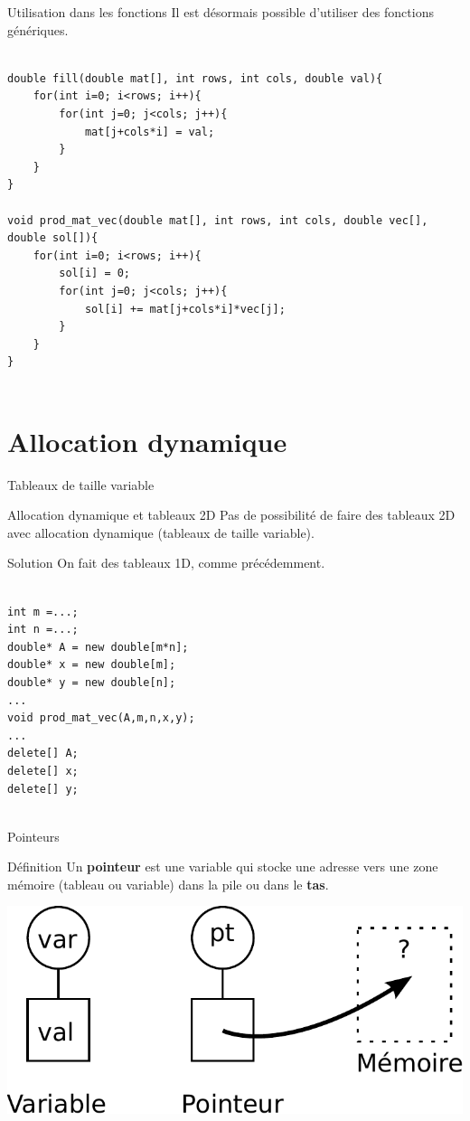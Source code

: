 \begin{frame}[fragile=singleslide]{Utilisation dans les fonctions}
    Il est désormais possible d'utiliser des fonctions génériques.
    \begin{verbatim}
        
double fill(double mat[], int rows, int cols, double val){
    for(int i=0; i<rows; i++){
        for(int j=0; j<cols; j++){
            mat[j+cols*i] = val;
        }
    }
}

void prod_mat_vec(double mat[], int rows, int cols, double vec[], double sol[]){
    for(int i=0; i<rows; i++){
        sol[i] = 0;
        for(int j=0; j<cols; j++){
            sol[i] += mat[j+cols*i]*vec[j];
        }
    }
}
        
    \end{verbatim}
\end{frame}

\section{Allocation dynamique}

\begin{frame}[fragile=singleslide]{Tableaux de taille variable}
    \begin{block}{Allocation dynamique et tableaux 2D}
        Pas de possibilité de faire des tableaux 2D avec allocation dynamique (tableaux de taille variable).
    \end{block}
    \begin{block}{Solution}
        On fait des tableaux 1D, comme précédemment.
    \end{block}
    \begin{verbatim}
        
int m =...;
int n =...;
double* A = new double[m*n];
double* x = new double[m];
double* y = new double[n];
...
void prod_mat_vec(A,m,n,x,y);
...
delete[] A;
delete[] x;
delete[] y;
        
    \end{verbatim}
\end{frame}

\begin{frame}{Pointeurs}
    \begin{block}{Définition}
        Un \textbf{pointeur} est une variable qui stocke une adresse vers une zone mémoire (tableau ou variable) dans la pile ou dans le \textbf{tas}.
    \end{block}
    \begin{center}
    \includegraphics[width=0.8\linewidth]{images/var_pointeur.pdf}
    \end{center}
\end{frame}


